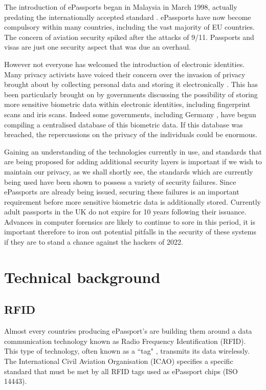 \documentclass[12pt]{article}
\begin{document}
The introduction of ePassports began in Malaysia in March 1998, actually predating the internationally accepted standard \cite{Avoine:2008wf}. ePassports have now become compulsory within many countries, including the vast majority of EU countries. The concern of aviation security spiked after the attacks of 9/11. Passports and visas are just one security aspect that was due an overhaul.

However not everyone has welcomed the introduction of electronic identities. Many privacy activists have voiced their concern over the invasion of privacy brought about by collecting personal data and storing it electronically \cite{Blundo:2008vs}. This has been particularly brought on by governments discussing the possibility of storing more sensitive biometric data within electronic identities, including fingerprint scans and iris scans. Indeed some governments, including Germany \cite{JRC:2008ws}, have begun compiling a centralised database of this biometric data. If this database was breached, the repercussions on the privacy of the individuals could be enormous. 

Gaining an understanding of the technologies currently in use, and standards that are being proposed for adding additional security layers is important if we wish to maintain our privacy, as we shall shortly see, the standards which are currently being used have been shown to possess a variety of security failures. Since ePassports are already being issued, securing these failures is an important requirement before more sensitive biometric data is additionally stored. Currently adult passports in the UK do not expire for 10 years following their issuance. Advances in computer forensics are likely to continue to sore in this period, it is important therefore to iron out potential pitfalls in the security of these systems if they are to stand a chance against the hackers of 2022. 

\section{Technical background}
{\color{red}{This section could cover the history of the topic, the mathematical background, or even the political context.
Prior to ePassports security}}

\subsection{RFID}
\label{sec:RFID}
Almost every countries producing ePassport's are building them around a data communication technology known as Radio Frequency Identification (RFID). This type of technology, often known as a ``tag" \cite{Juels:2005wf}, transmits its data wirelessly. The International Civil Aviation Organisation (ICAO) specifies a specific standard that must be met by all RFID tags used as ePassport chips (ISO 14443). 
\end{document}
